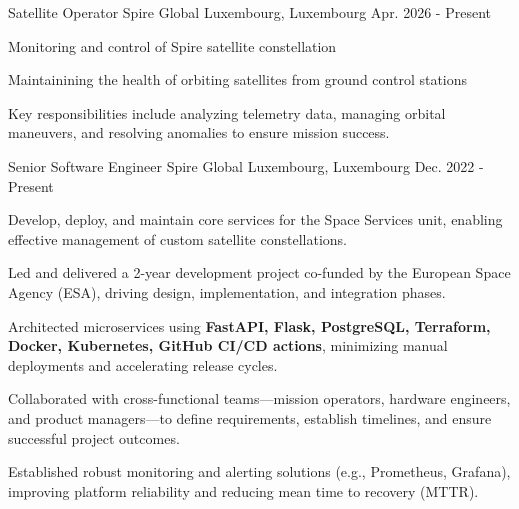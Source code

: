 
\begin{cventries}

  \cventry
  {Satellite Operator} %
  {Spire Global} %
  {Luxembourg, Luxembourg} %
  {Apr. 2026 - Present} %
  {
    \begin{cvitems} %
      \item {Monitoring and control of Spire satellite constellation}
      \item {Maintainining the health of orbiting satellites from ground control stations}
      \item {Key responsibilities include analyzing telemetry data, managing orbital maneuvers, and resolving anomalies to ensure mission success.}
    \end{cvitems}
  }

  \cventry
  {Senior Software Engineer} %
  {Spire Global} %
  {Luxembourg, Luxembourg} %
  {Dec. 2022 - Present} %
  {
    \begin{cvitems}
      \item {Develop, deploy, and maintain core services for the Space Services unit, enabling effective management of custom satellite constellations.}
      \item {Led and delivered a 2-year development project co-funded by the European Space Agency (ESA), driving design, implementation, and integration phases.}
      \item {Architected microservices using \textbf{FastAPI, Flask, PostgreSQL, Terraform, Docker, Kubernetes, GitHub CI/CD actions}, minimizing manual deployments and accelerating release cycles.}
      \item {Collaborated with cross-functional teams—mission operators, hardware engineers, and product managers—to define requirements, establish timelines, and ensure successful project outcomes.}
      \item {Established robust monitoring and alerting solutions (e.g., Prometheus, Grafana), improving platform reliability and reducing mean time to recovery (MTTR).}
    \end{cvitems}
  }


\end{cventries}
